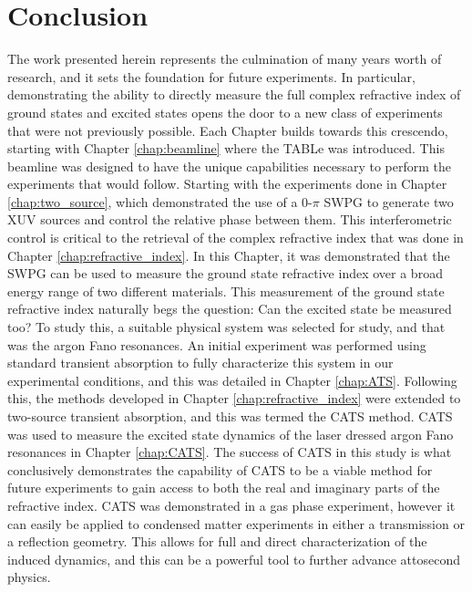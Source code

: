 \chapter{Conclusion}
\label{chap:conclusion}


The work presented herein represents the culmination of many years worth of research, and it sets the foundation for future experiments. In particular, demonstrating the ability to directly measure the full complex refractive index of ground states and excited states opens the door to a new class of experiments that were not previously possible.  Each Chapter builds towards this crescendo, starting with Chapter \ref{chap:beamline} where the TABLe was introduced.  This beamline was designed to have the unique capabilities necessary to perform the experiments that would follow.  Starting with the experiments done in Chapter \ref{chap:two_source}, which demonstrated the use of a 0-$\pi$ SWPG to generate two XUV sources and control the relative phase between them.  This interferometric control is critical to the retrieval of the complex refractive index that was done in Chapter \ref{chap:refractive_index}.  In this Chapter, it was demonstrated that the SWPG can be used to measure the ground state refractive index over a broad energy range of two different materials.  This measurement of the ground state refractive index naturally begs the question: Can the excited state be measured too?  To study this, a suitable physical system was selected for study, and that was the argon Fano resonances.  An initial experiment was performed using standard transient absorption to fully characterize this system in our experimental conditions, and this was detailed in Chapter \ref{chap:ATS}.  Following this, the methods developed in Chapter \ref{chap:refractive_index} were extended to two-source transient absorption, and this was termed the CATS method.  CATS was used to measure the excited state dynamics of the laser dressed argon Fano resonances in Chapter \ref{chap:CATS}.  The success of CATS in this study is what conclusively demonstrates the capability of CATS to be a viable method for future experiments to gain access to both the real and imaginary parts of the refractive index.  CATS was demonstrated in a gas phase experiment, however it can easily be applied to condensed matter experiments in either a transmission or a reflection geometry.  This allows for full and direct characterization of the induced dynamics, and this can be a powerful tool to further advance attosecond physics.





